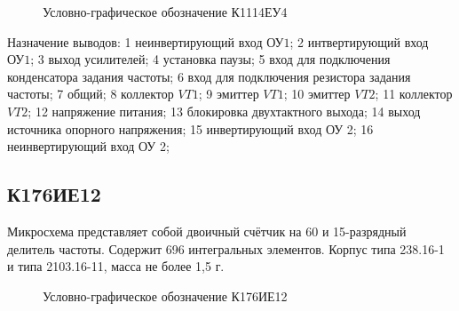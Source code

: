 \begin{figure}[ht]
  
  \caption{Условно-графическое обозначение К1114ЕУ4}
  \label{img:k1114eu4}
\end{figure}

Назначение выводов:
1 \longndash неинвертирующий вход $\text{ОУ} 1$;
2 \longndash интвертирующий вход $\text{ОУ} 1$;
3 \longndash выход усилителей;
4 \longndash установка паузы;
5 \longndash вход для подключения конденсатора задания частоты;
6 \longndash вход для подключения резистора задания частоты;
7 \longndash общий;
8 \longndash коллектор $VT1$;
9 \longndash эмиттер $VT1$;
10 \longndash эмиттер $VT2$;
11 \longndash коллектор $VT2$;
12 \longndash напряжение питания;
13 \longndash блокировка двухтактного выхода;
14 \longndash выход источника опорного напряжения;
15 \longndash инвертирующий вход ОУ 2;
16 \longndash неинвертирующий вход ОУ 2; 

\subsection*{К176ИЕ12}

Микросхема представляет собой двоичный счётчик на 60 и 15-разрядный делитель частоты. Содержит 696 интегральных элементов. Корпус типа 238.16-1 и типа 2103.16-11, масса не более 1,5 г. \\

\begin{figure}[ht]
  
  \caption{Условно-графическое обозначение К176ИЕ12}
  \label{img:k176ie12}
\end{figure}

